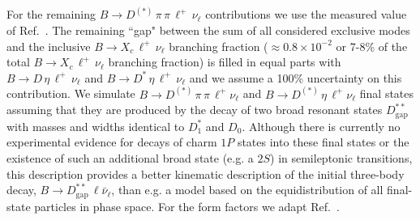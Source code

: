 \documentclass[twocolumn,aps,prd,superscriptaddress,nofootinbib,floatfix,preprintnumbers,a4]{revtex4-1}
\newcommand{\bclnu}{\ensuremath{B \to X_c \, \ell^+\, \nu_{\ell}}\xspace}
\begin{document}
For the remaining $B \to D^{(*)} \, \pi \, \pi \, \ell^+ \, \nu_\ell$ contributions we use the measured value of Ref.~\cite{Lees:2015eya}. The remaining ``gap" between the sum of all considered exclusive modes and the inclusive \bclnu branching fraction ($\approx 0.8 \times 10^{-2}$ or 7-8\% of the total \bclnu branching fraction) is filled in equal parts with $B \to D \, \eta \, \ell^+ \, \nu_\ell$ and $B \to D^{*} \, \eta \, \ell^+ \, \nu_\ell$ and we assume a 100\% uncertainty on this contribution. We simulate \mbox{$B \to D^{(*)} \, \pi \, \pi \, \ell^+  \nu_\ell$} and \mbox{$B \to D^{(*)} \, \eta  \, \ell^+  \nu_\ell$} final states assuming that they are produced by the decay of two broad resonant states $D^{**}_{\mathrm{gap}}$ with masses and widths identical to $D_1^{*}$ and $D_0$. Although there is currently no experimental evidence for decays of charm $1P$ states into these final states or the existence of such an additional broad state (e.g. a $2S$) in semileptonic transitions, this description provides a better kinematic description of the initial three-body decay, $B \to D^{**}_{\mathrm{gap}} \, \ell \bar \nu_\ell$, than e.g. a model based on the equidistribution of all final-state particles in phase space. For the form factors we adapt Ref.~\cite{Bernlochner:2016bci}.
\end{document}
